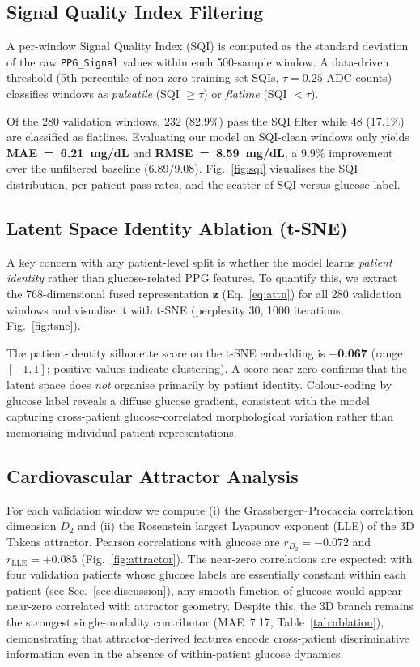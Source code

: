 \documentclass[conference]{IEEEtran}
\begin{document}
\subsection{Signal Quality Index Filtering}
\label{sec:sqi}

A per-window Signal Quality Index (SQI) is computed as the standard deviation
of the raw \texttt{PPG\_Signal} values within each 500-sample window.  A
data-driven threshold (5th percentile of non-zero training-set SQIs,
$\tau = 0.25$ ADC counts) classifies windows as \emph{pulsatile} (SQI
$\geq\tau$) or \emph{flatline} (SQI $<\tau$).

Of the 280 validation windows, 232 (82.9\%) pass the SQI filter while
48 (17.1\%) are classified as flatlines.  Evaluating our model on
SQI-clean windows only yields
\textbf{MAE~=~6.21~mg/dL} and \textbf{RMSE~=~8.59~mg/dL},
a 9.9\% improvement over the unfiltered baseline (6.89/9.08).
Fig.~\ref{fig:sqi} visualises the SQI distribution, per-patient pass rates,
and the scatter of SQI versus glucose label.

\subsection{Latent Space Identity Ablation (t-SNE)}
\label{sec:tsne}

A key concern with any patient-level split is whether the model learns
\emph{patient identity} rather than glucose-related PPG features.
To quantify this, we extract the 768-dimensional fused representation
$\mathbf{z}$ (Eq.~\ref{eq:attn}) for all 280 validation windows and
visualise it with t-SNE (perplexity 30, 1000 iterations;
Fig.~\ref{fig:tsne}).

The patient-identity silhouette score on the t-SNE embedding is
\textbf{$-$0.067} (range $[-1, 1]$; positive values indicate clustering).
A score near zero confirms that the latent space does \emph{not} organise
primarily by patient identity.  Colour-coding by glucose label reveals a
diffuse glucose gradient, consistent with the model capturing cross-patient
glucose-correlated morphological variation rather than memorising individual
patient representations.

\subsection{Cardiovascular Attractor Analysis}
\label{sec:attractor}

For each validation window we compute (i) the Grassberger--Procaccia
correlation dimension $D_2$ and (ii) the Rosenstein largest Lyapunov
exponent (LLE) of the 3D Takens attractor.  Pearson correlations with
glucose are $r_{D_2}=-0.072$ and $r_{\mathrm{LLE}}=+0.085$
(Fig.~\ref{fig:attractor}).
The near-zero correlations are expected: with four validation patients whose
glucose labels are essentially constant within each patient (see
Sec.~\ref{sec:discussion}), any smooth function of glucose would appear
near-zero correlated with attractor geometry.
Despite this, the 3D branch remains the strongest single-modality
contributor (MAE~7.17, Table~\ref{tab:ablation}), demonstrating that
attractor-derived features encode cross-patient discriminative information
even in the absence of within-patient glucose dynamics.
\end{document}
